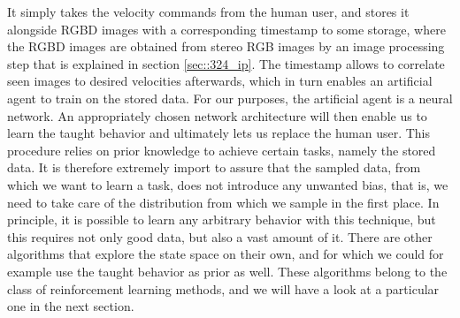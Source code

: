 It simply takes the velocity commands from the human user, and stores it alongside RGBD images with a corresponding timestamp to some storage, where the RGBD images are obtained from stereo RGB images by an image processing step that is explained in section \ref{sec::324_ip}. The timestamp allows to correlate seen images to desired velocities afterwards, which in turn enables an artificial agent to train on the stored data. For our purposes, the artificial agent is a neural network. An appropriately chosen network architecture will then enable us to learn the taught behavior and ultimately lets us replace the human user. This procedure relies on prior knowledge to achieve certain tasks, namely the stored data. It is therefore extremely import to assure that the sampled data, from which we want to learn a task, does not introduce any unwanted bias, that is, we need to take care of the distribution from which we sample in the first place. In principle, it is possible to learn any arbitrary behavior with this technique, but this requires not only good data, but also a vast amount of it. There are other algorithms that explore the state space on their own, and for which we could for example use the taught behavior as prior as well. These algorithms belong to the class of reinforcement learning methods, and we will have a look at a particular one in the next section.